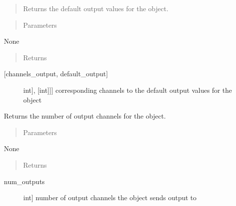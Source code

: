 \documentclass[letterpaper,10pt,english]{sphinxmanual}
\begin{document}
\begin{fulllineitems}
\begin{fulllineitems}
\begin{quote}
\sphinxAtStartPar
Returns the default output values for the object.
\end{quote}
\begin{quote}\begin{description}
\item[{Parameters}] \leavevmode
\end{description}\end{quote}

\sphinxAtStartPar
None
\begin{quote}\begin{description}
\item[{Returns}] \leavevmode
\end{description}\end{quote}
\begin{description}
\item[{{[}channels\_output, default\_output{]}}] \leavevmode{[}{[}{[}int{]}, {[}int{]}{]}{]}
\sphinxAtStartPar
corresponding channels to the default output values for the object

\end{description}

\end{fulllineitems}


\begin{fulllineitems}
\label{\detokenize{specific:EarOutput.EarOutput.get_num_channels}}
\sphinxAtStartPar
Returns the number of output channels for the object.
\begin{quote}\begin{description}
\item[{Parameters}] \leavevmode
\end{description}\end{quote}

\sphinxAtStartPar
None
\begin{quote}\begin{description}
\item[{Returns}] \leavevmode
\end{description}\end{quote}
\begin{description}
\item[{num\_outputs}] \leavevmode{[}int{]}
\sphinxAtStartPar
number of output channels the object sends output to


\end{description}
\end{fulllineitems}
\end{fulllineitems}
\end{document}

